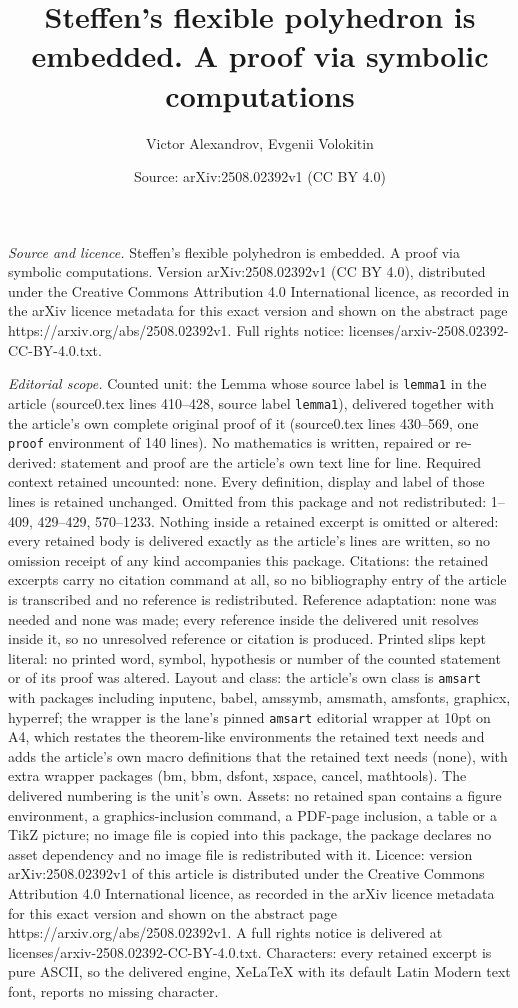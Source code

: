 \documentclass[10pt,a4paper]{amsart}
\title[Steffen's flexible polyhedron is embedded. A proof via symbo]{Steffen's flexible polyhedron is embedded. A proof via symbolic computations}
\author{Victor Alexandrov, Evgenii Volokitin}
\date{Source: arXiv:2508.02392v1 (CC BY 4.0)}
\begin{document}
\maketitle

\noindent\emph{Source and licence.} Steffen's flexible polyhedron is embedded. A proof via symbolic computations. Version arXiv:2508.02392v1 (CC BY 4.0), distributed under the Creative Commons Attribution 4.0 International licence, as recorded in the arXiv licence metadata for this exact version and shown on the abstract page https://arxiv.org/abs/2508.02392v1. Full rights notice: licenses/arxiv-2508.02392-CC-BY-4.0.txt.\par\smallskip

\noindent\textit{Editorial scope.} Counted unit: the Lemma whose source label is \texttt{lemma1} in the article (source0.tex lines 410--428, source label \texttt{lemma1}), delivered together with the article's own complete original proof of it (source0.tex lines 430--569, one \texttt{proof} environment of 140 lines). No mathematics is written, repaired or re-derived: statement and proof are the article's own text line for line. Required context retained uncounted: none. Every definition, display and label of those lines is retained unchanged. Omitted from this package and not redistributed: 1--409, 429--429, 570--1233. Nothing inside a retained excerpt is omitted or altered: every retained body is delivered exactly as the article's lines are written, so no omission receipt of any kind accompanies this package. Citations: the retained excerpts carry no citation command at all, so no bibliography entry of the article is transcribed and no reference is redistributed. Reference adaptation: none was needed and none was made; every reference inside the delivered unit resolves inside it, so no unresolved reference or citation is produced. Printed slips kept literal: no printed word, symbol, hypothesis or number of the counted statement or of its proof was altered. Layout and class: the article's own class is \texttt{amsart} with packages including inputenc, babel, amssymb, amsmath, amsfonts, graphicx, hyperref; the wrapper is the lane's pinned \texttt{amsart} editorial wrapper at 10pt on A4, which restates the theorem-like environments the retained text needs and adds the article's own macro definitions that the retained text needs (none), with extra wrapper packages (bm, bbm, dsfont, xspace, cancel, mathtools). The delivered numbering is the unit's own. Assets: no retained span contains a figure environment, a graphics-inclusion command, a PDF-page inclusion, a table or a TikZ picture; no image file is copied into this package, the package declares no asset dependency and no image file is redistributed with it. Licence: version arXiv:2508.02392v1 of this article is distributed under the Creative Commons Attribution 4.0 International licence, as recorded in the arXiv licence metadata for this exact version and shown on the abstract page https://arxiv.org/abs/2508.02392v1. A full rights notice is delivered at licenses/arxiv-2508.02392-CC-BY-4.0.txt. Characters: every retained excerpt is pure ASCII, so the delivered engine, XeLaTeX with its default Latin Modern text font, reports no missing character.
\end{document}
